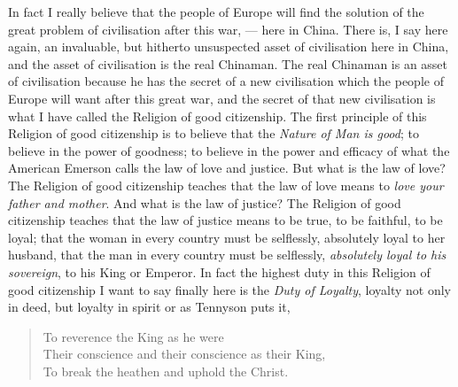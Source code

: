 In fact I really believe that the people of Europe will find the solution of the great problem of civilisation after this war, --- here in China. 
There is, I say here again, an invaluable, but hitherto unsuspected asset of civilisation here in China, and the asset of civilisation is the real Chinaman. 
The real Chinaman is an asset of civilisation because he has the secret of a new civilisation which the people of Europe will want after this great war, and the secret of that new civilisation is what I have called the Religion of good citizenship. 
The first principle of this Religion of good citizenship is to believe that the \emph{Nature of Man is good}; to believe in the power of goodness; to believe in the power and efficacy of what the American Emerson calls the law of love and justice. 
But what is the law of love? The Religion of good citizenship teaches that the law of love means to \emph{love your father and mother}. 
And what is the law of justice? 
The Religion of good citizenship teaches that the law of justice means to be true, to be faithful, to be loyal; that the woman in every country must be selflessly, absolutely loyal to her husband, that the man in every country must be selflessly, \emph{absolutely loyal to his sovereign}, to his King or Emperor. 
In fact the highest duty in this Religion of good citizenship I want to say finally here is the \emph{Duty of Loyalty}, loyalty not only in deed, but loyalty in spirit or as Tennyson  puts it,
\begin{quote}\footnotesize
    To reverence the King as he were\\
    Their conscience and their conscience as their King,\\
    To break the heathen and uphold the Christ.\\
\end{quote}
